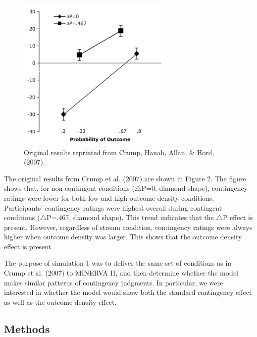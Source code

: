 \documentclass[
  english,
  man,floatsintext]{apa6}
\begin{document}
\begin{figure}

{\centering \includegraphics[width=3in]{imgs/crump_results} 

}

\caption{Original results reprinted from Crump, Hanah, Allan, \& Hord, (2007).}\label{fig:unnamed-chunk-2}
\end{figure}

The original results from Crump et al. (2007) are shown in Figure 2. The figure shows that, for non-contingent conditions (\(\triangle\)P=0, diamond shape), contingency ratings were lower for both low and high outcome density conditions. Participants' contingency ratings were highest overall during contingent conditions (\(\triangle\)P=.467, diamond shape). This trend indicates that the \(\triangle\)P effect is present. However, regardless of stream condition, contingency ratings were always higher when outcome density was larger. This shows that the outcome density effect is present.

The purpose of simulation 1 was to deliver the same set of conditions as in Crump et al. (2007) to MINERVA II, and then determine whether the model makes similar patterns of contingency judgments. In particular, we were interested in whether the model would show both the standard contingency effect as well as the outcome density effect.

\hypertarget{methods}{%
\subsection{Methods}\label{methods}}
\end{document}
